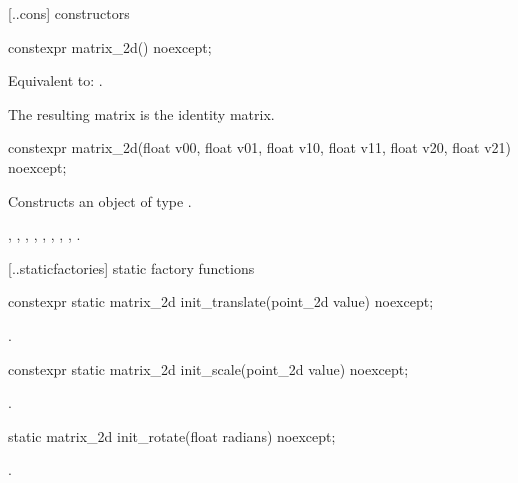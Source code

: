  [\iotwod.\matrixtwod.cons] { constructors}

%
\begin{itemdecl}
constexpr matrix_2d() noexcept;
\end{itemdecl}
\begin{itemdescr}
\pnum
\effects
Equivalent to: .

\pnum
\begin{note}
The resulting matrix is the identity matrix.
\end{note}
\end{itemdescr}

%
\begin{itemdecl}
constexpr matrix_2d(float v00, float v01, float v10, float v11,
  float v20, float v21) noexcept;
\end{itemdecl}
\begin{itemdescr}
\pnum
\effects
Constructs an object of type .

\pnum
{}, , , , , , , , .
\end{itemdescr}

 [\iotwod.\matrixtwod.staticfactories] { static factory 
functions}

%
\begin{itemdecl}
constexpr static matrix_2d init_translate(point_2d value) noexcept;
\end{itemdecl}
\begin{itemdescr}
\pnum
\returns
{}.
\end{itemdescr}

%
\begin{itemdecl}
constexpr static matrix_2d init_scale(point_2d value) noexcept;
\end{itemdecl}
\begin{itemdescr}
\pnum
\returns
{}.
\end{itemdescr}

%
\begin{itemdecl}
static matrix_2d init_rotate(float radians) noexcept;
\end{itemdecl}
\begin{itemdescr}
\pnum
\returns
{}.
\end{itemdescr}

